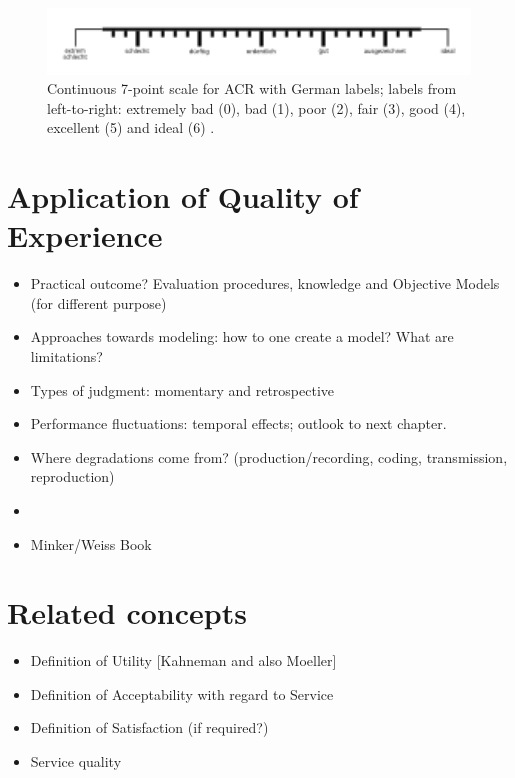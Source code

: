
\begin{figure}
	\includegraphics[width=1\textwidth]{fig/quality7pt_scale}
	\caption{Continuous 7-point scale for \ac{ACR} with German labels; labels from left-to-right: extremely bad (0), bad (1), poor (2), fair (3), good (4), excellent (5) and ideal (6) \citep{itu-t_p.805:_2007}.}
	\label{img:chap02:quality-scale}
\end{figure}



\section{Application of \acf{Quality of Experience}}
\begin{itemize}
\item Practical outcome? Evaluation procedures, knowledge and Objective Models (for different purpose)

\item Approaches towards modeling: how to one create a model? What are limitations?
\item Types of judgment: momentary and retrospective
\item Performance fluctuations: temporal effects; outlook to next chapter.
\item Where degradations come from? (production/recording, coding, transmission, reproduction)
\item \cite{pitrey_aligning_2011}
\item Minker/Weiss Book
\end{itemize}


\section{Related concepts}
\begin{itemize}
\item Definition of Utility [Kahneman and also Moeller]
\item Definition of Acceptability with regard to Service
\item Definition of Satisfaction (if required?)
\item Service quality
\end{itemize}